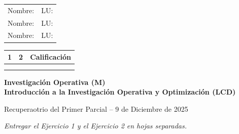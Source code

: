 \documentclass[a4paper,oneside,12pt]{amsart}
\newcommand{\nombremateria}
{Investigaci\'on Operativa (M) \\ Introducción a la Investigación Operativa y Optimización (LCD)}
\newcommand{\numeroparcial}
    { Recuperaotrio del Primer Parcial }
\newcommand{\fecha}
    {9 de Diciembre de 2025}
\theoremstyle{definition}
\begin{document}
    \begin{minipage}[t]{0.55\textwidth}
    \begin{tabularx}{\textwidth}{Xl}
        Nombre: & LU: \hphantom{5cm}\\[0.5em]
        Nombre: & LU: \\[0.5em]
        Nombre: & LU: \\[0.5em]
    \end{tabularx}
    \end{minipage}
    \hfill
    \begin{minipage}[t]{0.35\textwidth}
        \begin{tabular}[c]{|c|c|c|}
            \hline
            1 & 2 & Calificación \\ \hline \hline
            \hspace{1.2 cm} & \hspace{1.2 cm} & \hspace{1.5 cm} \\
            \hspace{1.2 cm} & \hspace{1.2 cm} & \hspace{1.5 cm} \\ \hline
        \end{tabular}
    \end{minipage}

%
%
%

\hrulefill

\smallskip
\renewcommand{\baselinestretch}{1.1}

\begin{center}
	\large \textbf{\nombremateria} 
	
	\numeroparcial -- \fecha
\end{center}

\vspace{.6cm}
\renewcommand{\theenumi}{\textbf{\arabic{enumi}}}

\begin{center}
    \emph{Entregar el Ejercicio 1 y el Ejercicio 2 en hojas separadas.}
\end{center}
\end{document}
